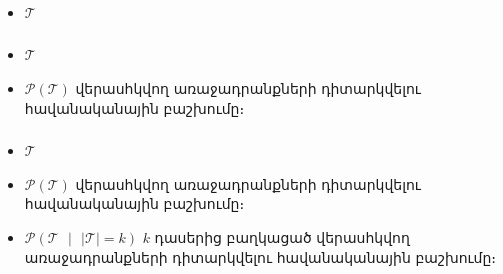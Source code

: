\documentclass[10pt]{beamer}
\begin{document}
\begin{frame}[t]
\frametitle{}
\end{frame}

\begin{frame}[t]
\frametitle{}
\begin{itemize}
\vspace{8mm}
\item $\mathcal{T}$ 
\end{itemize}
\end{frame}


\begin{frame}[t]
\frametitle{}
\begin{itemize}
\vspace{8mm}
\item $\mathcal{T}$ 

\item $\mathcal{P}(\mathcal{T})$ վերասհկվող առաջադրանքների դիտարկվելու հավանականային բաշխումը։
\end{itemize}
\end{frame}


\begin{frame}[t]
\frametitle{}
\begin{itemize}
\vspace{8mm}
\item $\mathcal{T}$ 

\item $\mathcal{P}(\mathcal{T})$ վերասհկվող առաջադրանքների դիտարկվելու հավանականային բաշխումը։

\item $\mathcal{P}(\mathcal{T} \text{ } |\text{ }  |\mathcal{T}| = k )$ $k$ դասերից բաղկացած վերասհկվող առաջադրանքների դիտարկվելու հավանականային բաշխումը։
\end{itemize}
\end{frame}


\begin{frame}[t]
\frametitle{}
\end{frame}
\end{document}
